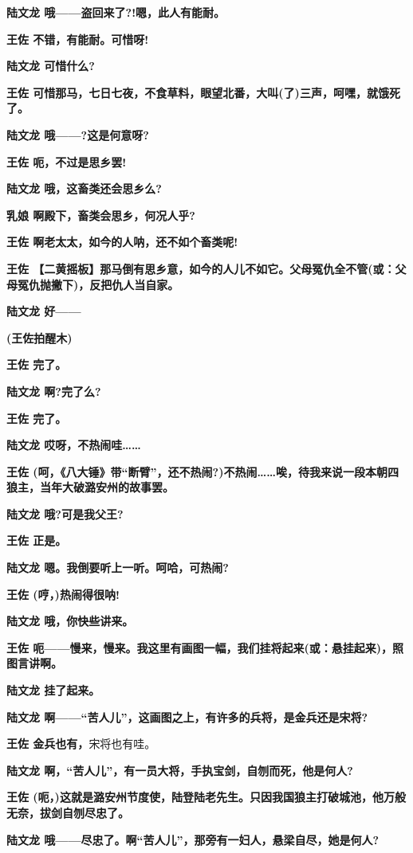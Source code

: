\textbf{陆文龙 哦------盗回来了?!嗯，此人有能耐。}

\textbf{王佐 不错，有能耐。可惜呀!}

\textbf{陆文龙 可惜什么?}

\textbf{王佐
可惜那马，七日七夜，不食草料，眼望北番，大叫(了)三声，呵嘿，就饿死了。}

\textbf{陆文龙 哦------?这是何意呀?}

\textbf{王佐 呃，不过是思乡罢!}

\textbf{陆文龙 哦，这畜类还会思乡么?}

\textbf{乳娘 啊殿下，畜类会思乡，何况人乎?}

\textbf{王佐 啊老太太，如今的人呐，还不如个畜类呢!}

\textbf{王佐
【二黄摇板】那马倒有思乡意，如今的人儿不如它。父母冤仇全不管(或：父母冤仇抛撇下)，反把仇人当自家。}

\textbf{陆文龙 好------}

\textbf{(王佐拍醒木)}

\textbf{王佐 完了。}

\textbf{陆文龙 啊?完了么?}

\textbf{王佐 完了。}

\textbf{陆文龙 哎呀，不热闹哇\ldots{}\ldots{}}

\textbf{王佐
(呵，《八大锤》带``断臂''，还不热闹?)不热闹\ldots{}\ldots{}唉，待我来说一段本朝四狼主，当年大破潞安州的故事罢。}

\textbf{陆文龙 哦?可是我父王?}

\textbf{王佐 正是。}

\textbf{陆文龙 嗯。我倒要听上一听。呵哈，可热闹?}

\textbf{王佐 (哼，)热闹得很呐!}

\textbf{陆文龙 哦，你快些讲来。}

\textbf{王佐
呃------慢来，慢来。我这里有画图一幅，我们挂将起来(或：悬挂起来)，照图言讲啊。}

\textbf{陆文龙 挂了起来。}

\textbf{陆文龙
啊------``苦人儿''，这画图之上，有许多的兵将，是金兵还是宋将?}

\textbf{王佐 金兵也有，}宋将也有哇。

\textbf{陆文龙
啊，``苦人儿''，有一员大将，手执宝剑，自刎而死，他是何人?}

\textbf{王佐
(呃，)这就是潞安州节度使，陆登陆老先生。只因我国狼主打破城池，他万般
无奈，拔剑自刎尽忠了。}

\textbf{陆文龙
哦------尽忠了。啊``苦人儿''，那旁有一妇人，悬梁自尽，她是何人?}

